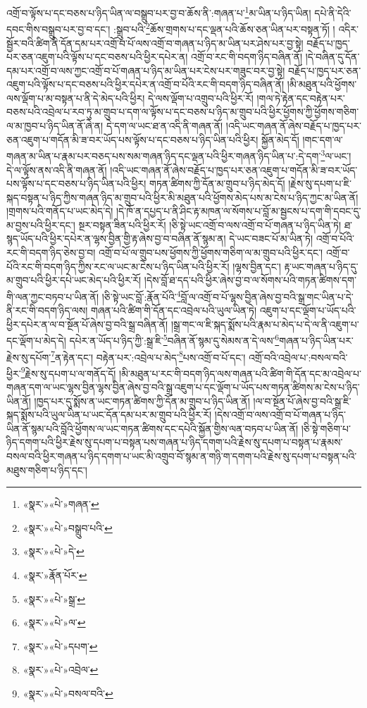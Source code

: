 འགྲོ་བ་ལྟོས་པ་དང་བཅས་པ་ཉིད་ཡིན་ལ་བསྒྲུབ་པར་བྱ་བ་ཆོས་ནི་:གཞན་པ་\footnote{«སྣར་»«པེ་»གཞན་}མ་ཡིན་པ་ཉིད་ཡིན། དཔེ་ནི་དེའི་དབང་གིས་བསྒྲུབ་པར་བྱ་བ་དང་། :སྒྲུབ་པའི་\footnote{«སྣར་»«པེ་»བསྒྲུབ་པའི་}ཆོས་གྲགས་པ་དང་ལྡན་པའི་ཆོས་ཅན་ཡིན་པར་བསྟན་ཏོ། །
འདིར་སྦྱོར་བའི་ཚིག་ནི་དོན་དམ་པར་འགྲོ་བ་པོ་ལས་འགྲོ་བ་གཞན་པ་ཉིད་མ་ཡིན་པར་ཤེས་པར་བྱ་སྟེ། བརྗོད་པ་ཁྱད་པར་ཅན་འཇུག་པའི་ལྟོས་པ་དང་བཅས་པའི་ཕྱིར་དཔེར་ན། འགྲོ་བ་རང་གི་བདག་ཉིད་བཞིན་ནོ། །དེ་བཞིན་དུ་དོན་དམ་པར་འགྲོ་བ་ལས་ཀྱང་འགྲོ་བ་པོ་གཞན་པ་ཉིད་མ་ཡིན་པར་ངེས་པར་གཟུང་བར་བྱ་སྟེ། བརྗོད་པ་ཁྱད་པར་ཅན་འཇུག་པའི་ལྟོས་པ་དང་བཅས་པའི་ཕྱིར་དཔེར་ན་འགྲོ་བ་པོའི་རང་གི་བདག་ཉིད་བཞིན་ནོ། །མི་མཐུན་པའི་ཕྱོགས་ལས་ལྡོག་པ་མ་བསྟན་པ་ནི་དེ་མེད་པའི་ཕྱིར། དེ་ལས་ལྡོག་པ་འགྲུབ་པའི་ཕྱིར་རོ། །གལ་ཏེ་རྟེན་དང་བརྟེན་པར་བཅས་པའི་འབྲེལ་པ་རབ་ཏུ་མ་གྲུབ་པ་དག་ལ་ལྟོས་པ་དང་བཅས་པ་ཉིད་མ་གྲུབ་པའི་ཕྱིར་ཕྱོགས་ཀྱི་ཕྱོགས་གཅིག་ལ་མ་ཁྱབ་པ་ཉིད་ཡིན་ནོ་ཞེ་ན། དེ་དག་ལ་ཡང་ཐ་ན་འདི་ནི་གཞན་ནོ། །འདི་ཡང་གཞན་ནོ་ཞེས་བརྗོད་པ་ཁྱད་པར་ཅན་འཇུག་པ་གདོན་མི་ཟ་བར་ཡོད་པས་ལྟོས་པ་དང་བཅས་པ་ཉིད་ཡིན་པའི་ཕྱིར། སྐྱོན་མེད་དོ། །གང་དག་ལ་གཞན་མ་ཡིན་པ་རྣམ་པར་བཅད་པས་སམ་གཞན་ཉིད་དང་ལྡན་པའི་ཕྱིར་གཞན་ཉིད་ཡིན་པ་:དེ་དག་\footnote{«སྣར་»«པེ་»དེ་}ལ་ཡང་། དེ་ལ་ལྟོས་ནས་འདི་ནི་གཞན་ནོ། །འདི་ཡང་གཞན་ནོ་ཞེས་བརྗོད་པ་ཁྱད་པར་ཅན་འཇུག་པ་གདོན་མི་ཟ་བར་ཡོད་པས་ལྟོས་པ་དང་བཅས་པ་ཉིད་ཡིན་པའི་ཕྱིར། གཏན་ཚིགས་ཀྱི་དོན་མ་གྲུབ་པ་ཉིད་མེད་དོ། །རྗེས་སུ་དཔག་པ་ཇི་སྐད་བསྟན་པ་ཉིད་ཀྱིས་གཞན་ཉིད་མ་གྲུབ་པའི་ཕྱིར་མི་མཐུན་པའི་ཕྱོགས་མེད་པས་མ་ངེས་པ་ཉིད་ཀྱང་མ་ཡིན་ནོ། །གྲགས་པའི་གནོད་པ་ཡང་མེད་དེ། །དེ་ཁོ་ན་དཔྱད་པ་ནི་ཤིང་རྟ་མཁན་ལ་སོགས་པ་བློ་མ་སྦྱངས་པ་དག་གི་དབང་དུ་མ་བྱས་པའི་ཕྱིར་དང་། སྔར་བསྟན་ཟིན་པའི་ཕྱིར་རོ། །ཅི་སྟེ་ཡང་འགྲོ་བ་ལས་འགྲོ་བ་པོ་གཞན་པ་ཉིད་ཡིན་ཏེ། ཐ་སྙད་ཡོད་པའི་ཕྱིར་དཔེར་ན་ལྷས་བྱིན་གྱི་རྟ་ཞེས་བྱ་བ་བཞིན་ནོ་སྙམ་ན། དེ་ཡང་བཟང་པོ་མ་ཡིན་ཏེ། འགྲོ་བ་པོའི་རང་གི་བདག་ཉིད་ཅེས་བྱ་བ། འགྲོ་བ་པོ་ལ་གྲུབ་པས་ཕྱོགས་ཀྱི་ཕྱོགས་གཅིག་ལ་མ་གྲུབ་པའི་ཕྱིར་དང་། འགྲོ་བ་པོའི་རང་གི་བདག་ཉིད་ཀྱིས་རང་ལ་ཡང་མ་ངེས་པ་ཉིད་ཡིན་པའི་ཕྱིར་རོ། །ལྷས་བྱིན་དང་། རྟ་ཡང་གཞན་པ་ཉིད་དུ་མ་གྲུབ་པའི་ཕྱིར་དཔེ་ཡང་མེད་པའི་ཕྱིར་རོ། །དེས་བློ་ཐ་དད་པའི་ཕྱིར་ཞེས་བྱ་བ་ལ་སོགས་པའི་གཏན་ཚིགས་དག་གི་ལན་ཀྱང་བཏབ་པ་ཡིན་ནོ། །ཅི་སྟེ་ཡང་བློ་:རྣོན་པོའི་\footnote{«སྣར་»རྣོན་པོར་}བློ་ལ་འགྲོ་བ་པོ་ལྷས་བྱིན་ཞེས་བྱ་བའི་སྒྲ་གང་ཡིན་པ་དེ་ནི་རང་གི་བདག་ཉིད་ལས། གཞན་པའི་ཚིག་གི་དོན་དང་འབྲེལ་པའི་ཡུལ་ཡིན་ཏེ། འཇུག་པ་དང་ལྡོག་པ་ཡོད་པའི་ཕྱིར་དཔེར་ན་ལ་བ་སྔོན་པོ་ཞེས་བྱ་བའི་སྒྲ་བཞིན་ནོ། །སྒྲ་གང་ལ་ཇི་སྐད་སྨོས་པའི་རྣམ་པ་མེད་པ་དེ་ལ་ནི་འཇུག་པ་དང་ལྡོག་པ་མེད་དེ། དཔེར་ན་ཡོད་པ་ཉིད་ཀྱི་:སྒྲ་ཇི་\footnote{«སྣར་»«པེ་»སྒྲ་}བཞིན་ནོ་སྙམ་དུ་སེམས་ན་དེ་ལས་\footnote{«སྣར་»«པེ་»ལ་}གཞན་པ་ཉིད་ཡིན་པར་རྗེས་སུ་དཔོག་\footnote{«སྣར་»«པེ་»དཔག་}ན་རྟེན་དང་། བརྟེན་པར་:འབྲེལ་པ་མེད་\footnote{«སྣར་»«པེ་»འབྲེལ་}པས་འགྲོ་བ་པོ་དང་། འགྲོ་བའི་འབྲེལ་པ་:བསལ་བའི་ཕྱིར་\footnote{«སྣར་»«པེ་»བསལ་བའི་}རྗེས་སུ་དཔག་པ་ལ་གནོད་དོ། །མི་མཐུན་པ་རང་གི་བདག་ཉིད་ལས་གཞན་པའི་ཚིག་གི་དོན་དང་མ་འབྲེལ་པ་གཞན་དག་ལ་ཡང་ལྷས་བྱིན་ལྷས་བྱིན་ཞེས་བྱ་བའི་སྒྲ་འཇུག་པ་དང་ལྡོག་པ་ཡོད་པས་གཏན་ཚིགས་མ་ངེས་པ་ཉིད་ཡིན་ནོ། །ཁྱད་པར་དུ་སྨོས་ན་ཡང་གཏན་ཚིགས་ཀྱི་དོན་མ་གྲུབ་པ་ཉིད་ཡིན་ནོ། །ལ་བ་སྔོན་པོ་ཞེས་བྱ་བའི་སྒྲ་ཇི་སྐད་སྨོས་པའི་ཡུལ་ཡིན་པ་ཡང་དོན་དམ་པར་མ་གྲུབ་པའི་ཕྱིར་རོ། །དེས་འགྲོ་བ་ལས་འགྲོ་བ་པོ་གཞན་པ་ཉིད་ཡིན་ནོ་སྙམ་པའི་བློའི་ཕྱོགས་ལ་ཡང་གཏན་ཚིགས་དང་དཔེའི་སྐྱོན་གྱིས་ལན་བཏབ་པ་ཡིན་ནོ། །ཅི་སྟེ་གཅིག་པ་ཉིད་དགག་པའི་ཕྱིར་རྗེས་སུ་དཔག་པ་བསྟན་པས་གཞན་པ་ཉིད་དགག་པའི་རྗེས་སུ་དཔག་པ་བསྟན་པ་རྣམས་བསལ་བའི་ཕྱིར་གཞན་པ་ཉིད་དགག་པ་ཡང་མི་འགྲུབ་བོ་སྙམ་ན་གཉི་ག་དགག་པའི་རྗེས་སུ་དཔག་པ་བསྟན་པའི་མཐུས་གཅིག་པ་ཉིད་དང་། 